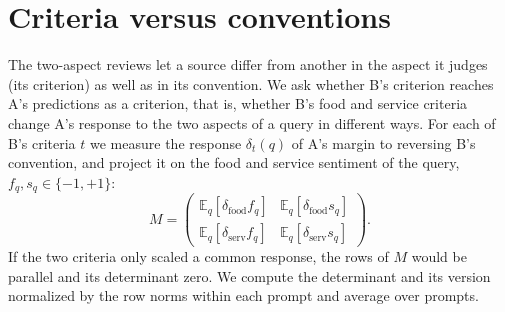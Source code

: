 \begin{table}[!ht]
\centering\small
{}
\caption{Reduction of $\Delta$ (A-only reading, shared words) when the answer-to-label path is blocked in one quarter of the layers only (L1: first quarter).}
\label{tab:app-bands}
\end{table}

\begin{table}[!ht]
\centering\small
{}
\caption{Attention mass (\%) from A's label positions in the native prompt, averaged over heads and layers.}
\label{tab:app-attention}
\end{table}

\section{Criteria versus conventions}
\label{app:criterion}

The two-aspect reviews let a source differ from another in the aspect it judges (its criterion) as well as in its convention.
We ask whether B's criterion reaches A's predictions as a criterion, that is, whether B's food and service criteria change A's response to the two aspects of a query in different ways.
For each of B's criteria $t$ we measure the response $\delta_t(q)$ of A's margin to reversing B's convention, and project it on the food and service sentiment of the query, $f_q,s_q\in\{-1,+1\}$:
\begin{equation*}
M=\begin{pmatrix}
\mathbb E_q[\delta_{\text{food}}f_q] & \mathbb E_q[\delta_{\text{food}}s_q]\\
\mathbb E_q[\delta_{\text{serv}}f_q] & \mathbb E_q[\delta_{\text{serv}}s_q]
\end{pmatrix}.
\end{equation*}
If the two criteria only scaled a common response, the rows of $M$ would be parallel and its determinant zero.
We compute the determinant and its version normalized by the row norms within each prompt and average over prompts.

